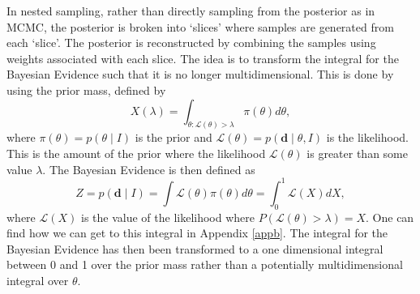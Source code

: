 In nested sampling, rather than directly sampling from the posterior as in \gls{MCMC}, the posterior is broken into `slices' where samples are generated from each `slice'.
The posterior is reconstructed by combining the samples using weights associated with each slice.
The idea is to transform the integral for the Bayesian Evidence such that it is no longer multidimensional.
This is done by using the prior mass, defined by
\begin{equation}
\label{searchcw:bayes:nested:priormass}
X(\lambda) = \int_{\theta: \mathcal{L}(\theta) > \lambda} \pi(\theta) d\theta,
\end{equation}
where $\pi(\theta) = p(\theta \mid I)$ is the prior and $\mathcal{L}(\theta)=p(\bm{d} \mid \theta, I)$ is the likelihood. This is the amount of the prior where the likelihood $\mathcal{L}(\theta)$ is greater than some value $\lambda$.
The Bayesian Evidence is then defined as 
\begin{equation}
\label{searchcw:bayes:nested:evidence}
Z = p(\bm{d} \mid I) = \int \mathcal{L}(\theta) \pi(\theta) d\theta = \int_0^1 \mathcal{L}(X) dX,
\end{equation}
where $\mathcal{L}(X)$ is the value of the likelihood where $P(\mathcal{L}(\theta) > \lambda) = X$. One can find how we can get to this integral in Appendix \ref{appb}.
The integral for the Bayesian Evidence has then been transformed to a one dimensional integral between 0 and 1 over the prior mass rather than a potentially multidimensional integral over $\theta$.

